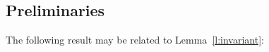 \begin{comment}
\subsection{Languages Under Consideration}
We consider the following variants of \HOp:
\begin{enumerate}[-]
	\item	\HO: the second and third lines of the syntax of processes in Fig.~\ref{fig:syntax} (pure higher-order, monadic communication).
	\item	\sesp: the first and third lines of the syntax of processes in Fig.~\ref{fig:syntax} (first-order, monadic communication).
	\item	\sespnr: the finite sub-calculus of \sesp, i.e., name passing without recursion.
	\item	$\HO^{+\mathsf{p}}$: The polyadic \HO, i.~e.\ without polyadicity (polyadic abstraction/application).
	\item	$\sesp^{+\mathsf{p}}$: The polyadic \sesp, i.~e.\ with polyadicity (name passing)
	\item	$\HOp^{-\mathsf{p}}$: The monadic \HOp.
\end{enumerate}
\noindent
In the following we write $\pmap{\cdot}{i}$
and $\tmap{\cdot}{i}$ 
for mappings of processes and types, respectively.
Since we always consider variants and fragments of \HOp, the 
reduction semantics $\red$, the typed behavioral equivalence $\wb$,
and the type system $\proves$ are the same for all languages.
\end{comment}

\subsection*{Preliminaries}

The following result may be related to Lemma~\ref{l:invariant}: 

